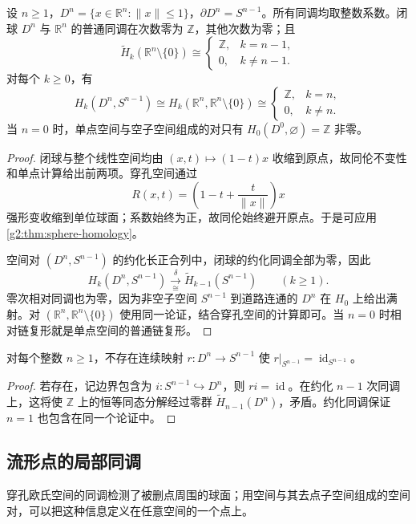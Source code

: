 \begin{proposition}\label{g2:prop:ball-puncture-homology}
	设 \(n\ge1\)，\(D^n=\{x\in\mathbb R^n:\|x\|\le1\}\)，\(\partial D^n=S^{n-1}\)。所有同调均取整数系数。闭球 \(D^n\) 与 \(\mathbb R^n\) 的普通同调在次数零为 \(\mathbb Z\)，其他次数为零；且
	\[
		\widetilde H_k(\mathbb R^n\setminus\{0\})
		\cong
		\begin{cases}\mathbb Z,&k=n-1,\\0,&k\ne n-1.\end{cases}
	\]
	对每个 \(k\ge0\)，有
	\[
		H_k(D^n,S^{n-1})\cong
		H_k(\mathbb R^n,\mathbb R^n\setminus\{0\})
		\cong
		\begin{cases}\mathbb Z,&k=n,\\0,&k\ne n.\end{cases}
	\]
	当 \(n=0\) 时，单点空间与空子空间组成的对只有 \(H_0(D^0,\varnothing)=\mathbb Z\) 非零。
\end{proposition}
\begin{proof}
	闭球与整个线性空间均由 \((x,t)\mapsto(1-t)x\) 收缩到原点，故同伦不变性和单点计算给出前两项。穿孔空间通过
	\[
		R(x,t)=\left(1-t+\frac{t}{\|x\|}\right)x
	\]
	强形变收缩到单位球面；系数始终为正，故同伦始终避开原点。于是可应用\cref{g2:thm:sphere-homology}。

	空间对 \((D^n,S^{n-1})\) 的约化长正合列中，闭球的约化同调全部为零，因此
	\[
		H_k(D^n,S^{n-1})\xrightarrow[\cong]{\delta}
		\widetilde H_{k-1}(S^{n-1})\qquad(k\ge1).
	\]
	零次相对同调也为零，因为非空子空间 \(S^{n-1}\) 到道路连通的 \(D^n\) 在 \(H_0\) 上给出满射。对 \((\mathbb R^n,\mathbb R^n\setminus\{0\})\) 使用同一论证，结合穿孔空间的计算即可。当 \(n=0\) 时相对链复形就是单点空间的普通链复形。
\end{proof}

\begin{corollary}\label{g2:cor:no-ball-boundary-retraction}
	对每个整数 \(n\ge1\)，不存在连续映射 \(r:D^n\to S^{n-1}\) 使 \(r|_{S^{n-1}}=\operatorname{id}_{S^{n-1}}\)。
\end{corollary}
\begin{proof}
	若存在，记边界包含为 \(i:S^{n-1}\hookrightarrow D^n\)，则 \(ri=\operatorname{id}\)。在约化 \(n-1\) 次同调上，这将使 \(\mathbb Z\) 上的恒等同态分解经过零群 \(\widetilde H_{n-1}(D^n)\)，矛盾。约化同调保证 \(n=1\) 也包含在同一个论证中。
\end{proof}

\subsection{流形点的局部同调}
\label{g2:subsec:0204:02}
穿孔欧氏空间的同调检测了被删点周围的球面；用空间与其去点子空间组成的空间对，可以把这种信息定义在任意空间的一个点上。

